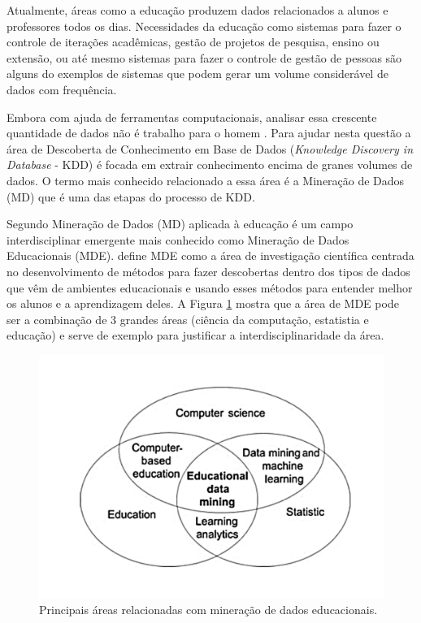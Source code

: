 \documentclass[diss-proposta,nocipinfo]{texufpel}
\begin{document}
Atualmente, áreas como a educação produzem dados relacionados a alunos e professores todos os dias.
Necessidades da educação como sistemas para fazer o controle de iterações acadêmicas, gestão de projetos de pesquisa, ensino ou extensão, ou até mesmo sistemas para fazer o controle de gestão de pessoas são alguns do exemplos de sistemas que podem gerar um volume considerável de dados com frequência.

Embora com ajuda de ferramentas computacionais, analisar essa crescente quantidade de dados não é trabalho para o homem \cite{goldschmidt2015data}. Para ajudar nesta questão a área de Descoberta de Conhecimento em Base de Dados (\textit{Knowledge Discovery in Database} - KDD) é focada em extrair conhecimento encima de granes volumes de dados. O termo mais conhecido relacionado a essa área é a Mineração de Dados (MD) que é uma das etapas do processo de KDD.

Segundo \citet{Koedinger2008} Mineração de Dados (MD) aplicada à educação é um campo interdisciplinar emergente mais conhecido como Mineração de Dados Educacionais (MDE).
\citet{baker2010data} define MDE como a área de investigação científica centrada no desenvolvimento de métodos para fazer descobertas dentro dos tipos de dados que vêm de ambientes educacionais e usando esses métodos para entender melhor os alunos e a aprendizagem deles. A Figura \ref{areas-relacionadas-mde} mostra que a área de MDE pode ser a combinação de 3 grandes áreas (ciência da computação, estatistia e educação) e serve de exemplo para justificar a interdisciplinaridade da área.

\begin{figure}[htbp]
  \centering \includegraphics[scale=.4]{imagens/areas-edm.pdf}
  \caption{Principais áreas relacionadas com mineração de dados educacionais. \cite{Koedinger2008}}
  \label{areas-relacionadas-mde}
\end{figure}
\end{document}
